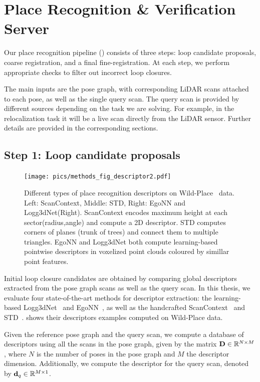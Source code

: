 \section{Place Recognition \& Verification Server} \label{sec:pipeline}
Our place recognition pipeline () consists of three steps: loop candidate proposals, coarse registration, and a final fine-registration. At each step, we perform appropriate checks to filter out incorrect loop closures.

The main inputs are the pose graph, with corresponding LiDAR scans attached to each pose, as well as the single query scan. The query scan is provided by different sources depending on the task we are solving. For example, in the relocalization task it will be a live scan directly from the LiDAR sensor. Further details are provided in the corresponding sections.

\subsection*{\textbf{Step 1: Loop candidate proposals}}
\label{subsubsec:loop-candidate}
\begin{figure}[htbp]
  \centering
  \texttt{[image: pics/methods\_fig\_descriptor2.pdf]}
  \caption{Different types of place recognition descriptors on Wild-Place~\cite{knights2023icra} data. Left: ScanContext, Middle: STD, Right: EgoNN and Logg3dNet(Right). ScanContext encodes maximum height at each sector(radius,angle) and compute a 2D descriptor. STD computes corners of planes (trunk of trees) and connect them to multiple triangles. EgoNN and Logg3dNet both compute learning-based pointwise descriptors in voxelized point clouds coloured by simillar point features.}
  \label{fig:descriptors_example}
\end{figure}
Initial loop closure candidates are obtained by comparing global descriptors extracted from the pose graph scans as well as the query scan. In this thesis, we evaluate four state-of-the-art methods for descriptor extraction: the learning-based Logg3dNet~\cite{vidanapathirana2022icra} and EgoNN~\cite{komorowski2022ral}, as well as the handcrafted ScanContext~\cite{kim2018iros} and STD~\cite{yuan2023icra}.  shows their descriptors examples computed on Wild-Place data.  

Given the reference pose graph and the query scan, we compute a database of descriptors using all the scans in the pose graph, given by the matrix $\mathbf{D} \in \mathbb{R}^{N\times M}$, where $N$ is the number of poses in the pose graph and $M$ the descriptor dimension. Additionally, we compute the descriptor for the query scan, denoted by $\mathbf{d}_{q} \in \mathbb{R}^{M \times 1}$. 

